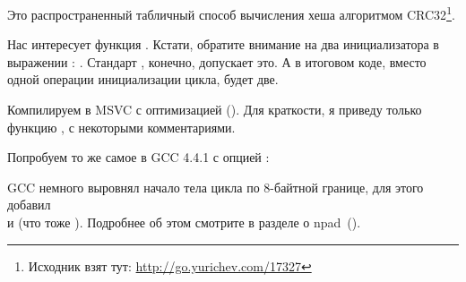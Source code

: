 \label{sec:CRC32}

\newcommand{\URLCRCSRC}{\url{http://go.yurichev.com/17327}}

Это распространенный табличный способ вычисления хеша алгоритмом 
CRC32\footnote{Исходник взят тут: \URLCRCSRC}.



Нас интересует функция . 
Кстати, обратите внимание на два инициализатора в выражении : . 
Стандарт \CCpp, конечно, допускает это. А в итоговом коде, вместо одной операции инициализации цикла, будет две.

Компилируем в MSVC с оптимизацией (\Ox). 
Для краткости, я приведу только функцию , с некоторыми комментариями.



Попробуем то же самое в GCC 4.4.1 с опцией \Othree:



GCC немного выровнял начало тела цикла по 8-байтной границе, для этого добавил \\
\NOP и  (что тоже ). 
Подробнее об этом смотрите в разделе о npad~().

